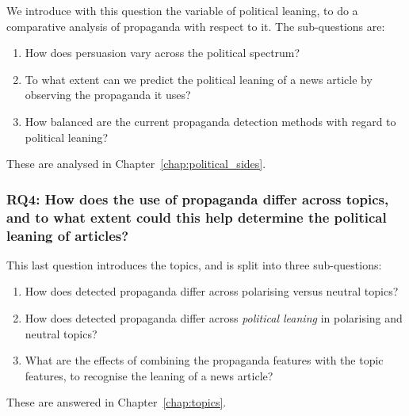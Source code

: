 We introduce with this question the variable of political leaning, to do a comparative analysis of propaganda with respect to it. The sub-questions are:

\begin{enumerate}[label={\textbf{RQ3.\arabic*:}},leftmargin=2cm]
    \item How does persuasion vary across the political spectrum?
    \item To what extent can we predict the political leaning of a news article by observing the propaganda it uses?
    \item How balanced are the current propaganda detection methods with regard to political leaning?
\end{enumerate}

These are analysed in Chapter~\ref{chap:political_sides}.

\subsubsection*{RQ4: How does the use of propaganda differ across topics, and to what extent could this help determine the political leaning of articles?}

This last question introduces the topics, and is split into three sub-questions:

\begin{enumerate}[label={\textbf{RQ4.\arabic*:}},leftmargin=2cm]
    \item How does detected propaganda differ across polarising versus neutral topics?
    \item How does detected propaganda differ across \emph{political leaning} in polarising and neutral topics?
    \item What are the effects of combining the propaganda features with the topic features, to recognise the leaning of a news article?
\end{enumerate}

These are answered in Chapter~\ref{chap:topics}.





